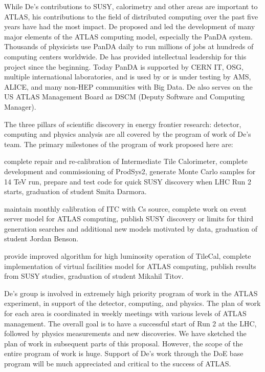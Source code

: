While De's contributions to SUSY, calorimetry and other areas are important to ATLAS, his contributions to the field of distributed computing over the past five years have had the most impact. De proposed and led the development of many major elements of the ATLAS computing model, especially the PanDA system. Thousands of physicists use PanDA daily to run millions of jobs at hundreds of computing centers worldwide. De has provided intellectual leadership for this project since the beginning. Today PanDA is supported by CERN IT, OSG, multiple international laboratories, and is used by or is under testing by AMS, ALICE, and many non-HEP communities with Big Data. De also serves on the US ATLAS Management Board as DSCM (Deputy Software and Computing Manager).

The three pillars of scientific discovery in energy frontier research: detector, computing and physics analysis are all covered by the program of work of De's team. The primary milestones of the program of work proposed here are:
\begin{description}
\item[2014] complete repair and re-calibration of Intermediate Tile Calorimeter, complete development and commissioning of ProdSys2, generate Monte Carlo samples for 14 TeV run, prepare and test code for quick SUSY discovery when LHC Run 2 starts, graduation of student Smita Darmora.
\item[2015] maintain monthly calibration of ITC with Cs source, complete work on event server model for ATLAS computing, publish SUSY discovery or limits for third generation searches and additional new models motivated by data, graduation of student Jordan Benson.
\item[2016] provide improved algorithm for high luminosity operation of TileCal, complete implementation of virtual facilities model for ATLAS computing, publish results from SUSY studies, graduation of student Mikahil Titov.
\end{description}

De's group is involved in extremely high priority program of work in the ATLAS experiment, in support of the detector, computing, and physics. The plan of work for each area is coordinated in weekly meetings with various levels of ATLAS management. The overall goal is to have a successful start of Run 2 at the LHC, followed by physics measurements and new discoveries. We have sketched the plan of work in subsequent parts of this proposal. However, the scope of the entire program of work is huge. Support of De's work through the DoE base program will be much appreciated and critical to the success of ATLAS.

